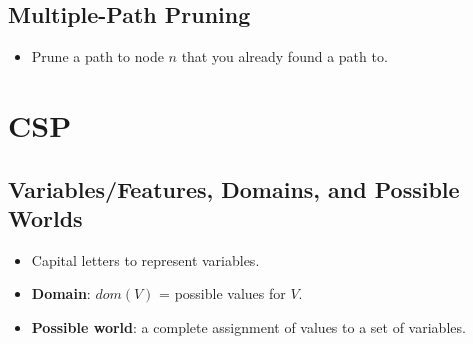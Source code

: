 \documentclass{article}
\begin{document}
\subsection{Multiple-Path Pruning}

\begin{itemize}
    \item Prune a path to node $n$ that you already found a path to.
\end{itemize}

\section{CSP}

\subsection{Variables/Features, Domains, and Possible Worlds}

\begin{itemize}
    \item Capital letters to represent variables.
    \item \textbf{Domain}: $dom(V)$ = possible values for $V$.
    \item \textbf{Possible world}: a complete assignment of values to a set of variables.
\end{itemize}
\end{document}
